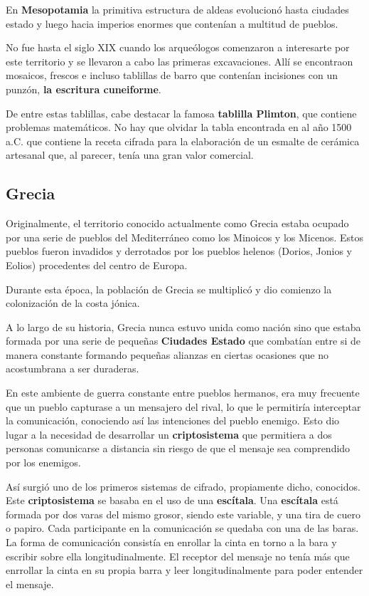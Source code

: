 \documentclass[nochap]{apuntesURJC}
\begin{document}
En \textbf{Mesopotamia} la primitiva estructura de aldeas evolucionó hasta ciudades estado y luego hacia imperios enormes que contenían a multitud de pueblos.

No fue hasta el siglo XIX cuando los arqueólogos comenzaron a interesarte por este territorio y se llevaron a cabo las primeras excavaciones. Allí se encontraon mosaicos, frescos e incluso tablillas de barro que contenían incisiones con un punzón, \textbf{la escritura cuneiforme}.

De entre estas tablillas, cabe destacar la famosa \textbf{tablilla Plimton}, que contiene problemas matemáticos. No hay que olvidar la tabla encontrada en al año 1500 a.C. que contiene la receta cifrada para la elaboración de un esmalte de cerámica artesanal que, al parecer, tenía una gran valor comercial.

\subsection{Grecia}
Originalmente, el territorio conocido actualmente como Grecia estaba ocupado por una serie de pueblos del Mediterráneo como los Minoicos y los Micenos. Estos pueblos fueron invadidos y derrotados por los pueblos helenos (Dorios, Jonios y Eolios) procedentes del centro de Europa.

Durante esta época, la población de Grecia se multiplicó y dio comienzo la colonización de la costa jónica.

A lo largo de su historia, Grecia nunca estuvo unida como nación sino que estaba formada por una serie de pequeñas \textbf{Ciudades Estado} que combatían entre si de manera constante formando pequeñas alianzas en ciertas ocasiones que no acostumbrana a ser duraderas.

En este ambiente de guerra constante entre pueblos hermanos, era muy frecuente que un pueblo capturase a un mensajero del rival, lo que le permitiría interceptar la comunicación, conociendo así las intenciones del pueblo enemigo. Esto dio lugar a la necesidad de desarrollar un \textbf{criptosistema} que permitiera a dos personas comunicarse a distancia sin riesgo de que el mensaje sea comprendido por los enemigos.

Así surgió uno de los primeros sistemas de cifrado, propiamente dicho, conocidos. Este \textbf{criptosistema} se basaba en el uso de una \textbf{escítala}. Una \textbf{escítala} está formada por dos varas del mismo grosor, siendo este variable, y una tira de cuero o papiro. Cada participante en la comunicación se quedaba con una de las baras. La forma de comunicación consistía en enrollar la cinta en torno a la bara y escribir sobre ella longitudinalmente. El receptor del mensaje no tenía más que enrrollar la cinta en su propia barra y leer longitudinalmente para poder entender el mensaje.
\end{document}
